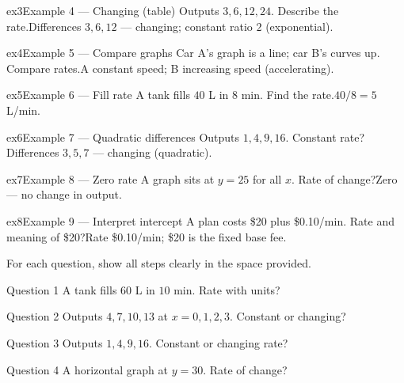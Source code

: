 \documentclass[11pt]{article}
\begin{document}
\begin{example}{ex3}{Example 4 --- Changing (table)}
Outputs $3,6,12,24$. Describe the rate.\soln Differences $3,6,12$ — changing; constant ratio $2$ (exponential).
\end{example}

\begin{example}{ex4}{Example 5 --- Compare graphs}
Car A's graph is a line; car B's curves up. Compare rates.\soln A constant speed; B increasing speed (accelerating).
\end{example}

\begin{example}{ex5}{Example 6 --- Fill rate}
A tank fills $40$ L in $8$ min. Find the rate.\soln $40/8=5$ L/min.
\end{example}

\begin{example}{ex6}{Example 7 --- Quadratic differences}
Outputs $1,4,9,16$. Constant rate?\soln Differences $3,5,7$ — changing (quadratic).
\end{example}

\begin{example}{ex7}{Example 8 --- Zero rate}
A graph sits at $y=25$ for all $x$. Rate of change?\soln Zero — no change in output.
\end{example}

\begin{example}{ex8}{Example 9 --- Interpret intercept}
A plan costs \$20 plus \$0.10/min. Rate and meaning of \$20?\soln Rate \$0.10/min; \$20 is the fixed base fee.
\end{example}

\clearpage
{}
For each question, show all steps clearly in the space provided.

\begin{qbox}{Question 1}
A tank fills $60$ L in $10$ min. Rate with units?\workspace{2.4cm}
\end{qbox}

\begin{qbox}{Question 2}
Outputs $4,7,10,13$ at $x=0,1,2,3$. Constant or changing?\workspace{2.4cm}
\end{qbox}

\begin{qbox}{Question 3}
Outputs $1,4,9,16$. Constant or changing rate?\workspace{2.4cm}
\end{qbox}

\begin{qbox}{Question 4}
A horizontal graph at $y=30$. Rate of change?\workspace{2.4cm}
\end{qbox}
\end{document}

